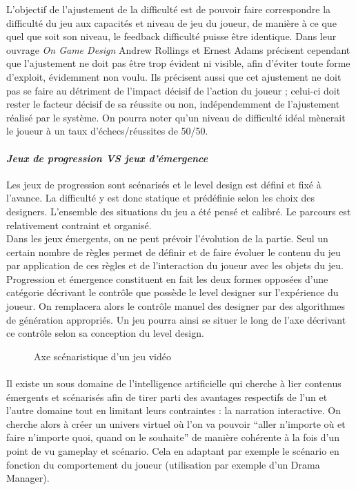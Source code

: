 L’objectif de l’ajustement de la difficulté est de pouvoir faire correspondre la difficulté du jeu aux capacités et niveau de jeu du joueur, de manière à ce que quel que soit son niveau, le feedback difficulté puisse être identique. Dans leur ouvrage \emph{On Game Design} \cite{Andr03} Andrew Rollings et Ernest Adams précisent cependant que l’ajustement ne doit pas être trop évident ni visible, afin d’éviter toute forme d’exploit, évidemment non voulu. Ils précisent aussi que cet ajustement ne doit pas se faire au détriment de l’impact décisif de l’action du joueur ; celui-ci doit rester le facteur décisif de sa réussite ou non, indépendemment de l’ajustement réalisé par le système. On pourra noter qu’un niveau de difficulté idéal mènerait le joueur à un taux d’échecs/réussites de 50/50.

	\paragraph{\emph{Jeux de progression VS jeux d’émergence} \\ \quad}
Les jeux de progression sont scénarisés et le level design est défini et fixé à l’avance. La difficulté y est donc statique et prédéfinie selon les choix des designers. L’ensemble des situations du jeu a été pensé et calibré. Le parcours est relativement contraint et organisé. \\
Dans les jeux émergents, on ne peut prévoir l’évolution de la partie. Seul un certain nombre de règles permet de définir et de faire évoluer le contenu du jeu par application de ces règles et de l’interaction du joueur avec les objets du jeu. \\
Progression et émergence constituent en fait les deux formes opposées d’une catégorie décrivant le contrôle que possède le level designer sur l’expérience du joueur. On remplacera alors le contrôle manuel des designer par des algorithmes de génération appropriés. Un jeu pourra ainsi se situer le long de l’axe décrivant ce contrôle selon sa conception du level design. 
\begin{figure}
\centering
\caption{Axe scénaristique d'un jeu vidéo}
\label{axe_scenaristique}
\end{figure}

\paragraph{}Il existe un sous domaine de l’intelligence artificielle qui cherche à lier contenus émergents et scénarisés afin de tirer parti des avantages respectifs de l’un et l’autre domaine tout en limitant leurs contraintes : la narration interactive. On cherche alors à créer un univers virtuel où l’on va pouvoir “aller n’importe où et faire n’importe quoi, quand on le souhaite” de manière cohérente à la fois d’un point de vu gameplay et scénario. Cela en adaptant par exemple le scénario en fonction du comportement du joueur (utilisation par exemple d’un Drama Manager).

